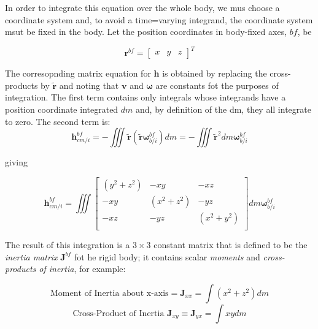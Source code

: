     In order to integrate this equation over the whole body, we mus choose a coordinate system and, to avoid a time=varying integrand, the coordinate system msut be fixed in the body. Let the position coordinates in body-fixed axes, \(bf\), be

    \begin{equation*}
        \mathbf{r}^{bf} = {\begin{bmatrix} x & y &z \end{bmatrix}}^{T}
    \end{equation*}

    The corresopnding matrix equation for \(\mathbf{h}\) is obtained by replacing the cross-products by \(\mathbf{\tilde{r}}\) and noting that \(\mathbf{v}\) and \(\mathbf{\omega}\) are constants fot the purposes of integration. The first term contains only integrals whose integrands have a position coordinate integrated \(dm\) and, by definition of the dm, they all integrate to zero. The second term is:
    \begin{equation*}
        \mathbf{h}^{bf}_{cm/i} = - \iiint \mathbf{\tilde{r}} \left( \mathbf{\tilde{r}} \mathbf{\omega}^{bf}_{b/i} \right) dm = - \iiint \mathbf{\tilde{r}}^{2} dm \mathbf{\omega}^{bf}_{b/i}
    \end{equation*}

    giving

    \begin{equation*}\tag{1.7-2}
        \mathbf{h}^{bf}_{cm/i} = \iiint \begin{bmatrix}
            \left(y^{2} + z^{2}\right)  & -xy                           & -xz \\
            -xy                         &   \left(x^{2} + z^{2}\right)  & -yz \\
            -xz                         &   -yz                         & \left(x^{2} + y^{2}\right) \\
        \end{bmatrix} dm \mathbf{\omega}^{bf}_{b/i}
    \end{equation*}

    The result of this integration is a \(3 \times 3\) constant matrix that is defined to be the \emph{inertia matrix} \(\mathbf{J}^{bf}\) fot he rigid body; it contains scalar \emph{moments} and \emph{cross-products of inertia}, for example:

    \begin{equation*}
        \text{Moment of Inertia about x-axis} = \mathbf{J}_{xx} = \int{ \left( x^{2} + z^{2} \right)} dm
    \end{equation*}
    \begin{equation*}
        \text{Cross-Product of Inertia } \mathbf{J}_{xy} \equiv \mathbf{J}_{yx} = \int{xy}dm
    \end{equation*}

